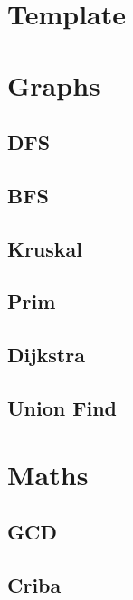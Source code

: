 \documentclass[twoside]{article}
\begin{document}
% 
\null
\thispagestyle{empty}
\newpage
{}
\selectfont
\begin{multicols*}{2}
	\tableofcontents
	\newpage
	\cleardoublepage
	
	\section{Template}
	
	\section{Graphs}
	    \subsection{DFS}
	    \subsection{BFS}
	    \subsection{Kruskal}
	    \subsection{Prim}
	    \subsection{Dijkstra}
	    \subsection{Union Find}
	
	\section{Maths}
	    \subsection{GCD}
	    \subsection{Criba}
	    

\end{multicols*}
\end{document}
